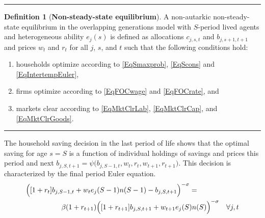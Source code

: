 \documentclass[letterpaper,12pt]{article}
\theoremstyle{definition}
\newtheorem{definition}{Definition} %
\begin{document}
\begin{spacing}{1.5}
    \vspace{7mm}
    \hrule
    \begin{definition}[\textbf{Non-steady-state equilibrium}]\label{DefEquilNonSS}
      A non-autarkic non-steady-state equilibrium in the overlapping generations model with $S$-period lived agents and heterogeneous ability $e_j(s)$ is defined as allocations $c_{j,s,t}$ and $b_{j,s+1,t+1}$ and prices $w_t$ and $r_t$ for all $j$, $s$, and $t$ such that the following conditions hold:
       \begin{enumerate}
          \item households optimize according to \eqref{EqSmaxprob}, \eqref{EqScons} and \eqref{EqIntertempEuler},
          \item firms optimize according to \eqref{EqFOCwage} and \eqref{EqFOCrate}, and
          \item markets clear according to \eqref{EqMktClrLab}, \eqref{EqMktClrCap}, and \eqref{EqMktClrGoods}.
       \end{enumerate}
    \end{definition}
    \hrule
    \vspace{10mm}

    \noindent The household saving decision in the last period of life shows that the optimal saving for age $s=S$ is a function of individual holdings of savings and prices this period and next $b_{j,S,t+1}=\psi\bigl(b_{j,S-1,t},w_t,r_t,w_{t+1},r_{t+1}\bigr)$. This decision is characterized by the final period Euler equation.
    \begin{equation}\label{EqEulerSm1}
      \begin{split}
        &\Bigl([1+r_t]b_{j,S-1,t} + w_t e_j(S-1)n(S-1) - b_{j,S,t+1}\Bigr)^{-\sigma} = \\
        &\quad\quad\quad\quad\quad \beta(1+r_{t+1})\Bigl([1+r_{t+1}]b_{j,S,t+1} + w_{t+1}e_j(S)n(S)\Bigr)^{-\sigma} \quad\forall j,t
      \end{split}
    \end{equation}


\end{spacing}
\end{document}
